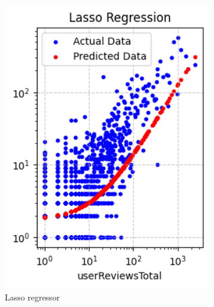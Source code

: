 \begin{figure}[H]
\begin{subfigure}{0.24\textwidth}
        \includegraphics[width=1\textwidth]{plots/lasso.png}
        \caption{Lasso regressor}
        \captionsetup{width=0.9\linewidth, justification=centering}
        \label{fig:lasso}
    \end{subfigure}
    \begin{subfigure}{0.24\textwidth}
        \centering

\end{subfigure}
\end{figure}
